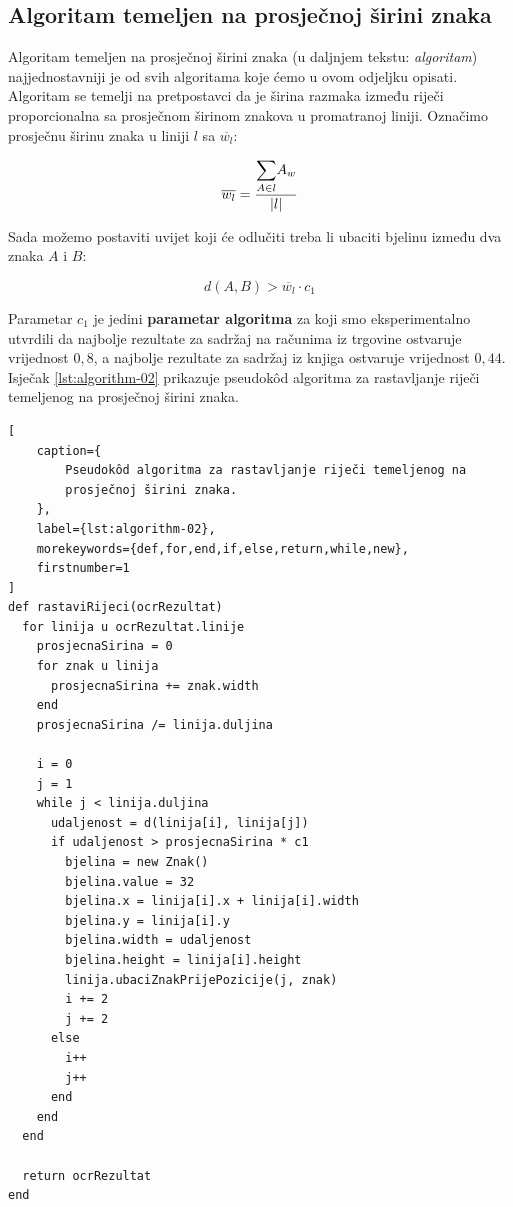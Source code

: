 \documentclass[times, utf8, zavrsni]{fer}
\begin{document}
\subsection{Algoritam temeljen na prosječnoj širini znaka}
\label{subsec:algoritam-temeljen-na-prosjecnoj-sirini znaka}
Algoritam temeljen na prosječnoj širini znaka (u daljnjem tekstu: \emph
{algoritam}) najjednostavniji je od svih algoritama koje ćemo u ovom odjeljku
opisati. Algoritam se temelji na pretpostavci da je širina razmaka između
riječi proporcionalna sa prosječnom širinom znakova u promatranoj liniji.
Označimo prosječnu širinu znaka u liniji $l$ sa $\overline{w_l}$:

\begin{equation}
\overline{w_l} = \frac{\mathlarger{\sum}\limits_{A \in l} A_w}{|l|}
\end{equation}

Sada možemo postaviti uvijet koji će odlučiti treba li ubaciti bjelinu između
dva znaka $A$ i $B$:

\begin{equation}
\label{eq:condition-01}
d(A, B) > \overline{w_l} \cdot c_1
\end{equation}

Parametar $c_1$ je jedini \textbf{parametar algoritma} za koji smo
eksperimentalno utvrdili da najbolje rezultate za sadržaj na računima iz
trgovine ostvaruje vrijednost $0{,}8$, a najbolje rezultate za sadržaj iz knjiga
ostvaruje vrijednost $0{,}44$. Isječak \ref{lst:algorithm-02} prikazuje
pseudokôd algoritma za rastavljanje riječi temeljenog na prosječnoj širini
znaka.

\begin{lstlisting}[
    caption={
        Pseudokôd algoritma za rastavljanje riječi temeljenog na
        prosječnoj širini znaka.
    },
    label={lst:algorithm-02},
    morekeywords={def,for,end,if,else,return,while,new},
    firstnumber=1
]
def rastaviRijeci(ocrRezultat)
  for linija u ocrRezultat.linije
    prosjecnaSirina = 0
    for znak u linija
      prosjecnaSirina += znak.width
    end
    prosjecnaSirina /= linija.duljina

    i = 0
    j = 1
    while j < linija.duljina
      udaljenost = d(linija[i], linija[j])
      if udaljenost > prosjecnaSirina * c1
        bjelina = new Znak()
        bjelina.value = 32
        bjelina.x = linija[i].x + linija[i].width
        bjelina.y = linija[i].y
        bjelina.width = udaljenost
        bjelina.height = linija[i].height
        linija.ubaciZnakPrijePozicije(j, znak)
        i += 2
        j += 2
      else
        i++
        j++
      end
    end
  end

  return ocrRezultat
end
\end{lstlisting}
\end{document}
